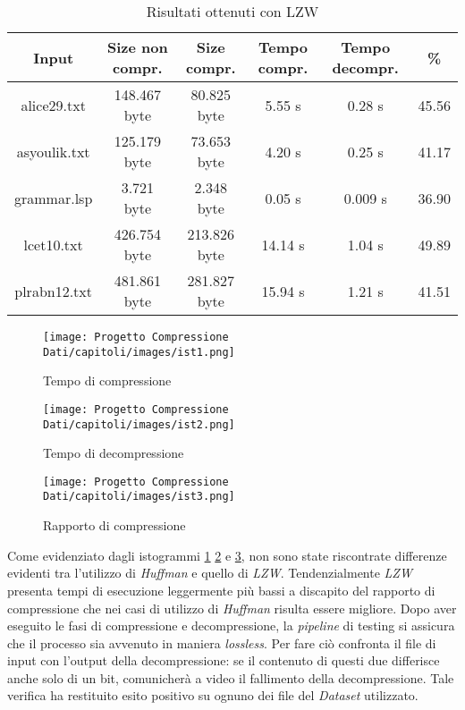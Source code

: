     \begin{table}
    \begin{tabular}{||c c c c c c||}
     \hline
     Input & Size non compr. & Size compr. & Tempo compr. & Tempo decompr. & \% \\ [0.5ex] 
     \hline\hline
     alice29.txt & 148.467 byte & 80.825 byte & 5.55 s & 0.28 s & 45.56\\ 
     \hline
     asyoulik.txt & 125.179 byte & 73.653 byte & 4.20 s & 0.25 s & 41.17\\
     \hline
     grammar.lsp & 3.721 byte & 2.348 byte & 0.05 s & 0.009 s & 36.90\\
     \hline
     lcet10.txt & 426.754 byte & 213.826 byte & 14.14 s & 1.04 s & 49.89\\
     \hline
     plrabn12.txt & 481.861 byte & 281.827 byte & 15.94 s & 1.21 s & 41.51\\ [1ex] 
     \hline
    \end{tabular} 
    \caption{Risultati ottenuti con LZW\label{tab:lzw}}
    \end{table}
\begin{figure}[h]
    \centering
    \texttt{[image: Progetto Compressione Dati/capitoli/images/ist1.png]}
\caption{Tempo di compressione}
    \label{fig:ist1}
\end{figure} 
\begin{figure}[h]
    \centering
    \texttt{[image: Progetto Compressione Dati/capitoli/images/ist2.png]}
\caption{Tempo di decompressione}
    \label{fig:ist2}
\end{figure} 
\begin{figure}[h]
    \centering
    \texttt{[image: Progetto Compressione Dati/capitoli/images/ist3.png]}
\caption{Rapporto di compressione}
    \label{fig:ist3}
\end{figure} 
Come evidenziato dagli istogrammi \ref{fig:ist1} \ref{fig:ist2} e \ref{fig:ist3}, non sono state riscontrate differenze evidenti tra l'utilizzo di \emph{Huffman} e quello di \emph{LZW}. Tendenzialmente \emph{LZW} presenta tempi di esecuzione leggermente più bassi a discapito del rapporto di compressione che nei casi di utilizzo di \emph{Huffman} risulta essere migliore. 
Dopo aver eseguito le fasi di compressione e decompressione, la \emph{pipeline} di testing si assicura che il processo sia avvenuto in maniera \emph{lossless}. Per fare ciò confronta il file di input con l'output della decompressione: se il contenuto di questi due differisce anche solo di un bit, comunicherà a video il fallimento della decompressione. Tale verifica ha restituito esito positivo su ognuno dei file del \emph{Dataset} utilizzato.